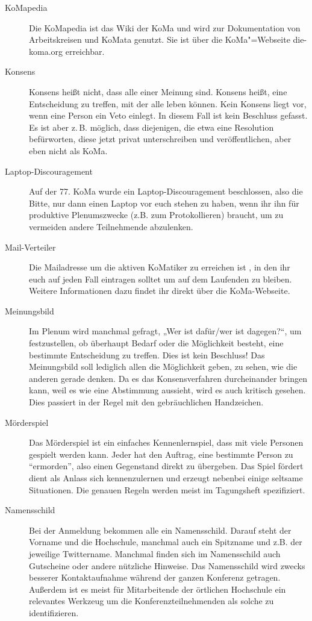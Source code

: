 \begin{description}
\item[KoMapedia]
    Die KoMapedia ist das Wiki der KoMa und wird zur Dokumentation von Arbeitskreisen und KoMata genutzt. Sie ist über die KoMa"=Webseite	die-koma.org erreichbar.

\item[Konsens]
    Konsens heißt nicht, dass alle einer Meinung sind. Konsens heißt, eine Entscheidung zu treffen, mit der alle leben können. Kein Konsens liegt vor, wenn eine Person ein Veto einlegt. In diesem Fall ist kein Beschluss gefasst.  Es ist aber z.\,B. möglich, dass diejenigen, die etwa eine Resolution befürworten, diese jetzt privat unterschreiben und veröffentlichen, aber eben nicht als KoMa.

\item[Laptop-Discouragement]
    Auf der 77. KoMa wurde ein Laptop-Discouragement beschlossen, also die Bitte,     nur dann einen Laptop vor euch stehen zu haben, wenn ihr ihn für produktive Plenumszwecke (z.B. zum       Protokollieren) braucht, um zu vermeiden andere Teilnehmende abzulenken.

\item[Mail-Verteiler]
    Die Mailadresse um die aktiven KoMatiker zu erreichen ist , in den ihr euch auf jeden Fall eintragen solltet um auf dem Laufenden zu bleiben. Weitere Informationen dazu findet ihr direkt über die KoMa-Webseite.

\item[Meinungsbild]
    Im Plenum wird manchmal gefragt, „Wer ist dafür/wer ist dagegen?“, um festzustellen, ob überhaupt Bedarf oder die Möglichkeit besteht, eine bestimmte Entscheidung zu treffen. Dies ist kein Beschluss! Das Meinungsbild soll lediglich allen die Möglichkeit geben, zu sehen, wie die anderen gerade denken. Da es das Konsensverfahren durcheinander bringen kann, weil es wie eine Abstimmung aussieht, wird es auch kritisch gesehen. Dies passiert in der Regel mit den gebräuchlichen Handzeichen.

\item[Mörderspiel]
    Das Mörderspiel ist ein einfaches Kennenlernspiel, dass mit viele Personen gespielt werden kann. Jeder hat den Auftrag, eine bestimmte Person zu \enquote{ermorden}, also einen Gegenstand direkt zu übergeben.
    Das Spiel fördert dient als Anlass sich kennenzulernen und erzeugt nebenbei einige seltsame Situationen.
    Die genauen Regeln werden meist im Tagungsheft spezifiziert.
    
\item[Namensschild]
    Bei der Anmeldung bekommen alle ein	Namensschild. Darauf steht der Vorname und die Hochschule, manchmal auch ein Spitzname und z.B. der jeweilige Twittername. Manchmal finden sich im Namensschild auch Gutscheine oder andere nützliche Hinweise. Das Namensschild wird zwecks besserer Kontaktaufnahme während der ganzen Konferenz getragen. Außerdem ist es meist für Mitarbeitende der örtlichen Hochschule ein relevantes Werkzeug um die Konferenzteilnehmenden als solche zu identifizieren.


\end{description}
